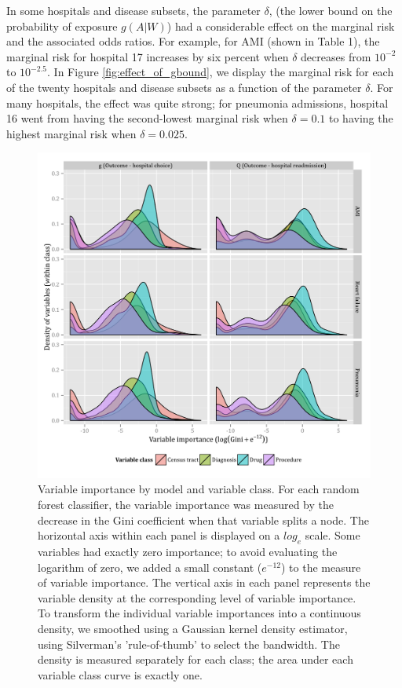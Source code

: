 \documentclass[]{article}\usepackage[]{graphicx}\usepackage[]{color}
\begin{document}
In some hospitals and disease subsets, the parameter $\delta$, (the lower bound on the probability of exposure $g(A|W)$) had a considerable effect on the marginal risk and the associated odds ratios. For example, for AMI (shown in Table 1), the marginal risk for hospital 17 increases by six percent when $\delta$ decreases from $10^{-2}$ to $10^{-2.5}$. In Figure \ref{fig:effect_of_gbound}, we display the marginal risk for each of the twenty hospitals and disease subsets as a function of the parameter $\delta$. For many hospitals, the effect was quite strong; for pneumonia admissions, hospital 16 went from having the second-lowest marginal risk when $\delta=0.1$ to having the highest marginal risk when $\delta=0.025$.


\begin{figure}[H]
    \includegraphics{../figures/variable_importance_by_model_and_class.png}
    \caption[Error rate for random forest model of hospital choice.]
{Variable importance by model and variable class. For each random forest classifier, the variable importance was measured by the decrease in the Gini coefficient when that variable splits a node. The horizontal axis within each panel is displayed on a $log_e$ scale. Some variables had exactly zero importance; to avoid evaluating the logarithm of zero, we added a small constant ($e^{-12}$) to the measure of variable importance. The vertical axis in each panel represents the variable density at the corresponding level of variable importance. To transform the individual variable importances into a continuous density, we smoothed using a Gaussian kernel density estimator, using Silverman's 'rule-of-thumb' \supercite{silverman_density_1986} to select the bandwidth. The density is measured separately for each class; the area under each variable class curve is exactly one.
}
   \label{fig:variable_importance_by_model_and_class}
\end{figure}
\end{document}
